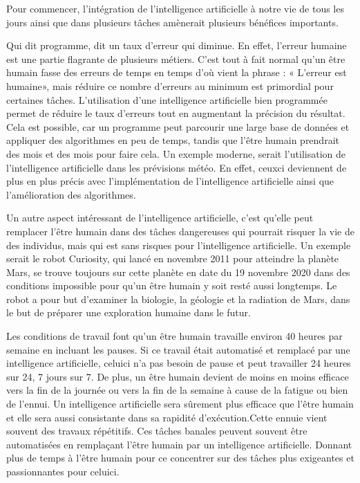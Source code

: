 \documentclass[letterpaper,10pt,french]{sphinxmanual}
\begin{document}
Pour commencer, l’intégration de l’intelligence artificielle à notre vie de tous les jours ainsi que dans plusieurs tâches amènerait plusieurs bénéfices importants.

Qui dit programme, dit un taux d’erreur qui diminue. En effet, l’erreur humaine est une partie flagrante de plusieurs métiers. C’est tout à fait normal qu’un être humain fasse des erreurs de temps en temps d’où vient la phrase : « L’erreur est humaine», mais réduire ce nombre d’erreurs au minimum est primordial pour certaines tâches. L’utilisation d’une intelligence artificielle bien programmée permet de réduire le taux d’erreurs tout en augmentant la précision du résultat. Cela est possible, car un programme peut parcourir une large base de données et appliquer des algorithmes en peu de temps, tandis que l’être humain prendrait des mois et des mois pour faire cela. Un exemple moderne, serait l’utilisation de l’intelligence artificielle dans les prévisions météo. En effet, ceux\sphinxhyphen{}ci deviennent de plus en plus précis avec l’implémentation de l’intelligence artificielle ainsi que l’amélioration des algorithmes.

Un autre aspect intéressant de l’intelligence artificielle, c’est qu’elle peut remplacer l’être humain dans des tâches dangereuses qui pourrait risquer la vie de des individus, mais qui est sans risques pour l’intelligence artificielle. Un exemple serait le robot Curiosity, qui lancé en novembre 2011 pour atteindre la planète Mars, se trouve toujours sur cette planète en date du 19 novembre 2020 dans des conditions impossible pour qu’un être humain y soit resté aussi longtemps. Le robot a pour but d’examiner la biologie, la géologie  et la radiation de Mars, dans le but de préparer une exploration humaine dans le futur.

Les conditions de travail font qu’un être humain travaille environ 40 heures par semaine en incluant les pauses. Si ce travail était automatisé et remplacé par une intelligence artificielle, celui\sphinxhyphen{}ci n’a pas besoin de pause et peut travailler 24 heures sur 24, 7 jours sur 7. De plus, un être humain devient de moins en moins efficace vers la fin de la journée ou vers la fin de la semaine à cause de la fatigue ou bien de l’ennui. Un intelligence artificielle sera sûrement plus efficace que l’être humain et elle sera aussi consistante dans sa rapidité d’exécution.Cette ennuie vient souvent des travaux répétitifs. Ces tâches banales peuvent souvent être automatisées en remplaçant l’être humain par un intelligence artificielle. Donnant plus de temps à l’être humain pour ce concentrer sur des tâches plus exigeantes et passionnantes pour celui\sphinxhyphen{}ci.
\end{document}
